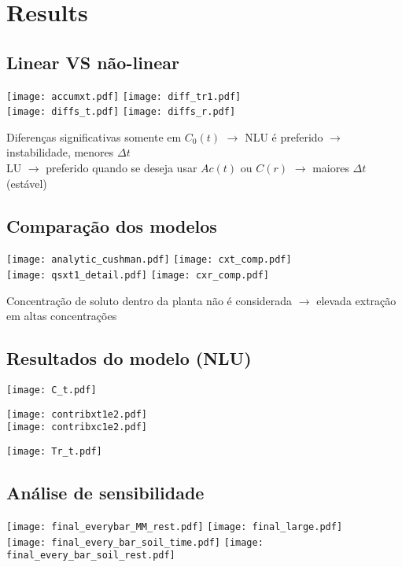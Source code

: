 \section{Results}

\subsection{Linear VS não-linear}
\begin{frame}
  \texttt{[image: accumxt.pdf]}
  \texttt{[image: diff\_tr1.pdf]}\\[.5cm]
  
  \texttt{[image: diffs\_t.pdf]}
  \texttt{[image: diffs\_r.pdf]}

  Diferenças significativas somente em $C_0(t)$ $\rightarrow$ NLU é preferido $\rightarrow$ instabilidade, menores $\Delta t$\\
  LU $\rightarrow$ preferido quando se deseja usar $Ac(t)$ ou $C(r)$ $\rightarrow$ maiores $\Delta t$ (estável)
\end{frame}

\subsection{Comparação dos modelos}
\begin{frame}
  \texttt{[image: analytic\_cushman.pdf]}
  \texttt{[image: cxt\_comp.pdf]}\\[.5cm]
  \texttt{[image: qsxt1\_detail.pdf]}
  \texttt{[image: cxr\_comp.pdf]}

  Concentração de soluto dentro da planta não é considerada $\rightarrow$ elevada extração em altas concentrações
\end{frame}

\subsection{Resultados do modelo (NLU)}
\begin{frame}
  \texttt{[image: C\_t.pdf]}
\end{frame}
\begin{frame}
  \texttt{[image: contribxt1e2.pdf]}\\[.5cm]
  \texttt{[image: contribxc1e2.pdf]}
\end{frame}
\begin{frame}
  \texttt{[image: Tr\_t.pdf]}
\end{frame}

\subsection{Análise de sensibilidade}
\begin{frame}
  \texttt{[image: final\_everybar\_MM\_rest.pdf]}
  \texttt{[image: final\_large.pdf]}\\[.5cm]
  \texttt{[image: final\_every\_bar\_soil\_time.pdf]}
  \texttt{[image: final\_every\_bar\_soil\_rest.pdf]}


\end{frame}
